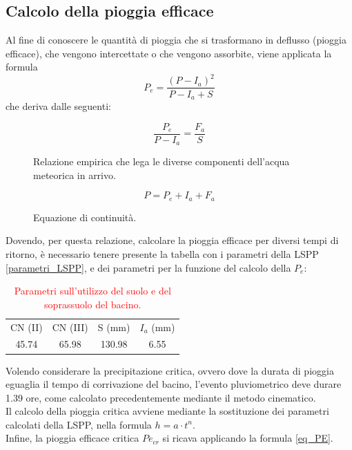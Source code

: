 \subsection{Calcolo della pioggia efficace}
Al fine di conoscere le quantità di pioggia che si trasformano in deflusso (pioggia efficace), che vengono intercettate o che vengono assorbite, viene applicata la formula 
\begin{equation}
P_e = \frac{(P-I_a)^2}{P-I_a+S} 
\label{eq_PE}
\end{equation}
che deriva dalle seguenti:
\begin{figure}[H]
\begin{equation}
    \frac{P_e}{P-I_a} = \frac{F_a}{S} 
\end{equation}
\caption*{Relazione empirica che lega le diverse componenti dell'acqua meteorica in arrivo.}
\end{figure}
\begin{figure}[H]
\begin{equation}
    P= P_e + I_a + F_a     
\end{equation}
\caption*{Equazione di continuità.}
\end{figure}

Dovendo, per questa relazione, calcolare la pioggia efficace per diversi tempi di ritorno, è necessario tenere presente la tabella con i parametri della LSPP \ref{parametri_LSPP}, e dei parametri per la funzione del calcolo della $P_e$:
\begin{table}[H] \centering
    \caption{\textcolor{red}{Parametri sull'utilizzo del suolo e del soprassuolo del bacino.}}
    \begin{tabular}{cccc}
    \toprule   
  CN (II)  & CN (III)  & S (mm) & $I_a$ (mm)  \\
  45.74  &      65.98       & 130.98  & 6.55 \\
  \bottomrule  
    \end{tabular}
    \end{table}

Volendo considerare la precipitazione critica, ovvero dove la durata di pioggia eguaglia il tempo di corrivazione del bacino, l'evento pluviometrico deve durare 1.39 ore, come calcolato precedentemente mediante il metodo cinematico.\\
Il calcolo della pioggia critica avviene mediante la sostituzione dei parametri calcolati della LSPP, nella formula $h=a\cdot t^n$.\\
Infine, la pioggia efficace critica $Pe_{cr}$ si ricava applicando la formula \ref{eq_PE}.
    			
